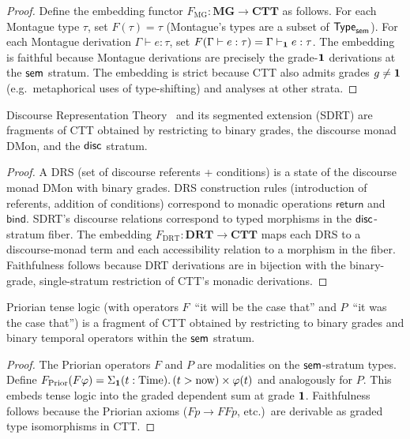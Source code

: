 \begin{proof}
Define the embedding functor $F_{\mathrm{MG}} : \mathbf{MG} \to
\mathbf{CTT}$ as follows.  For each Montague type $\tau$, set
$F(\tau) = \tau$ (Montague's types are a subset of $\mathsf{Type}_{\mathsf{sem}}$).
For each Montague derivation
$\Gamma \vdash e : \tau$, set
$F(\Gamma \vdash e : \tau) = \Gamma \vdash_{\mathbf{1}} e : \tau$.
The embedding is faithful because Montague derivations are precisely
the grade-$\mathbf{1}$ derivations at the $\mathsf{sem}$ stratum.  The embedding
is strict because CTT also admits grades $g \neq \mathbf{1}$ (e.g.\
metaphorical uses of type-shifting) and analyses at other strata.
\end{proof}

\begin{theorem}
\label{thm:sub-drt}
Discourse Representation Theory~\cite{kamp1993} and its segmented
extension (SDRT) are fragments of CTT obtained by restricting to
binary grades, the discourse monad $\mathrm{DMon}$, and the $\mathsf{disc}$
stratum.
\end{theorem}

\begin{proof}
A DRS (set of discourse referents + conditions) is a state of the
discourse monad $\mathrm{DMon}$ with binary grades.  DRS
construction rules (introduction of referents, addition of
conditions) correspond to monadic operations $\mathsf{return}$ and
$\mathsf{bind}$.  SDRT's discourse relations correspond to typed
morphisms in the $\mathsf{disc}$-stratum fiber.  The embedding
$F_{\mathrm{DRT}} : \mathbf{DRT} \to \mathbf{CTT}$ maps each DRS
to a discourse-monad term and each accessibility relation to a
morphism in the fiber.  Faithfulness follows because DRT derivations
are in bijection with the binary-grade, single-stratum restriction
of CTT's monadic derivations.
\end{proof}

\begin{theorem}
\label{thm:sub-prior}
Priorian tense logic (with operators $F$~``it will be the case
that'' and $P$~``it was the case that'') is a fragment of CTT
obtained by restricting to binary grades and binary temporal
operators within the $\mathsf{sem}$ stratum.
\end{theorem}

\begin{proof}
The Priorian operators $F$ and $P$ are modalities on the
$\mathsf{sem}$-stratum types.  Define
$F_{\mathrm{Prior}}(F\varphi) = \Sigma_{\mathbf{1}}(t :
\mathrm{Time}).\, (t > \mathrm{now}) \times \varphi(t)$
and analogously for $P$.  This embeds tense logic into the graded
dependent sum at grade $\mathbf{1}$.  Faithfulness follows because the
Priorian axioms ($Fp \to FFp$, etc.)\ are derivable as graded type
isomorphisms in CTT.
\end{proof}

